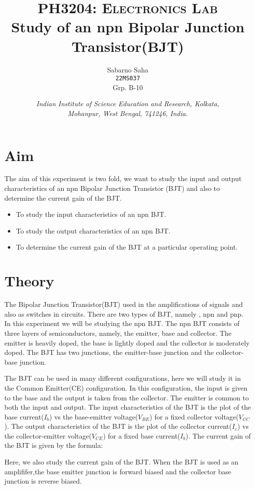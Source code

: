 \documentclass{scrartcl}
\title{
        \Large\textsc{PH3204: Electronics Lab} \\
        \vspace{10pt}
        \Huge \textbf{Study of an npn Bipolar Junction Transistor(BJT)} \\
}
\author{Sabarno Saha \\ \texttt{22MS037} \\ Grp. B-10}
\date{\normalsize
        \textit{Indian Institute of Science Education and Research, Kolkata, \\
        Mohanpur, West Bengal, 741246, India.}
}
\newcommand{\1}{\mathbbm{1}}
\begin{document}
\maketitle
\tableofcontents
\newpage
\section{Aim}

The aim of this experiment is two fold, we want to study the input and output characteristics of an npn
Bipolar Junction Transistor (BJT) and also to determine the current gain of the BJT.

\begin{itemize}
	\item To study the input characteristics of an npn BJT.
	\item To study the output characteristics of an npn BJT.
	\item To determine the current gain of the BJT at a particular operating point.
\end{itemize}



\section{Theory}
The Bipolar Junction Transistor(BJT) used in the amplifications of signals and also as switches in circuits. There are two types of BJT, namely , npn and pnp. In this experiment we will be studying the npn BJT.
 The npn BJT consists of three layers of semiconductors, namely, the emitter, base and collector. The emitter is heavily doped, the base is lightly doped and the collector is moderately doped. 
 The BJT has two junctions, the emitter-base junction and the collector-base junction. 

The BJT can be used in many different configurations, here we will study it in the Common Emitter(CE) configuration. In this configuration, the input is given to the base and the output is taken from the collector. 
The emitter is common to both the input and output. 
The input characteristics of the BJT is the plot of the base current($I_b$) vs the base-emitter voltage($V_{BE}$) for a fixed collector voltage($V_{CC}$). 
The output characteristics of the BJT is the plot of the collector current($I_c$) vs the collector-emitter voltage($V_{CE}$) for a fixed base current($I_b$). The current gain of the BJT is given by the formula:

Here, we also study the current gain of the BJT. When the BJT is used as an amplififer,the base emitter junction is forward biased and the collector base junction is reverse biased. 
\end{document}
